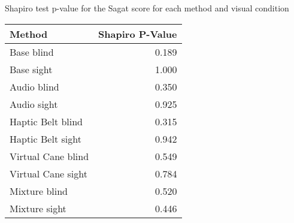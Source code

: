 
\centering
\caption{Shapiro test p-value for the Sagat score for each method and visual condition}
\label{tab:shapiro_sagat_score}
\begin{tabular}{lr}
\toprule
            Method &  Shapiro P-Value \\
\midrule
        Base blind &            0.189 \\
        Base sight &            1.000 \\
       Audio blind &            0.350 \\
       Audio sight &            0.925 \\
 Haptic Belt blind &            0.315 \\
 Haptic Belt sight &            0.942 \\
Virtual Cane blind &            0.549 \\
Virtual Cane sight &            0.784 \\
     Mixture blind &            0.520 \\
     Mixture sight &            0.446 \\
\bottomrule
\end{tabular}
